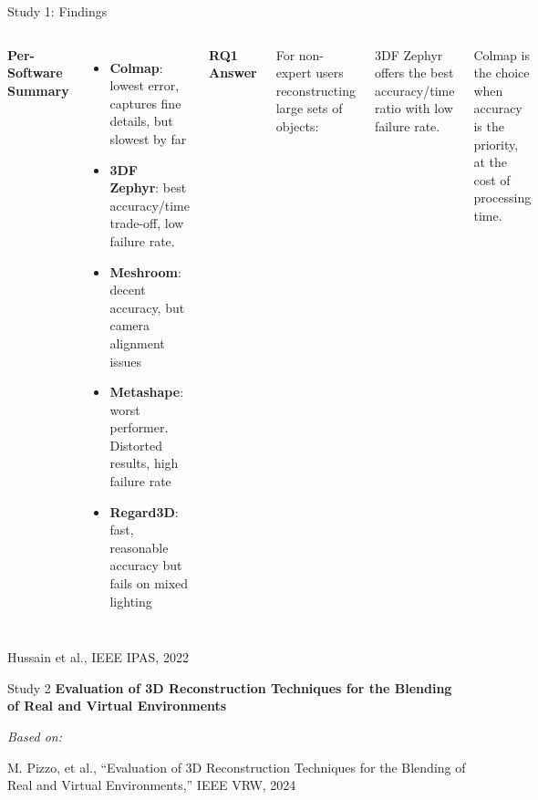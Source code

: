 \documentclass[aspectratio=169, 12pt]{beamer}
\newcommand{\citefooter}[1]{\hfill{\tiny #1}}
\begin{document}
\begin{frame}{Study 1: Findings}
	\begin{columns}[t]
		\textbf{\textcolor{gbAqua}{Per-Software Summary}}
		\begin{itemize}
			\item \textbf{Colmap}: lowest error, captures fine details, but slowest by far
			\item \textbf{3DF Zephyr}: best accuracy/time trade-off, low failure rate. 
			\item \textbf{Meshroom}: decent accuracy, but camera alignment issues
			\item \textbf{Metashape}: worst performer. Distorted results, high failure rate
			\item \textbf{Regard3D}: fast, reasonable accuracy but fails on mixed lighting
		\end{itemize}
		
		\textbf{\textcolor{gbAqua}{RQ1 Answer}}
		
		\vspace{0.1cm}
		
		For non-expert users reconstructing large sets of objects:
		
		\vspace{0.15cm}
		
		\alert{3DF Zephyr} offers the best accuracy/time ratio with low failure rate.
		
		\vspace{0.15cm}
		
		\alert{Colmap} is the choice when accuracy is the priority, at the cost of processing time.
		
	\end{columns}
	
	\citefooter{Hussain et al., IEEE IPAS, 2022}
\end{frame}


\begin{frame}{Study 2}
    \textbf{\textcolor{gbAqua}{Evaluation of 3D Reconstruction Techniques for the Blending of Real and Virtual Environments}}
    
    \vspace{0.5cm}
    
    \small\textit{Based on:}
    
    \vspace{0.2cm}
    
    {\footnotesize M. Pizzo, et al., ``Evaluation of 3D Reconstruction Techniques for the Blending of Real and Virtual Environments,'' IEEE VRW, 2024}
\end{frame}
\end{document}
